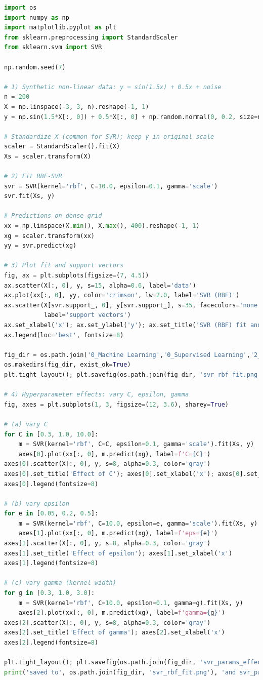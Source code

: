\documentclass{article}
\begin{document}
\begin{lstlisting}[language=Python,caption={gen_svr_figures.py}]
import os
import numpy as np
import matplotlib.pyplot as plt
from sklearn.preprocessing import StandardScaler
from sklearn.svm import SVR

np.random.seed(7)

# 1) Synthetic non-linear data: y = sin(1.5x) + 0.5x + noise
n = 200
X = np.linspace(-3, 3, n).reshape(-1, 1)
y = np.sin(1.5*X[:, 0]) + 0.5*X[:, 0] + np.random.normal(0, 0.2, size=n)

# Standardize X (common for SVR); keep y in original scale
scaler = StandardScaler().fit(X)
Xs = scaler.transform(X)

# 2) Fit RBF-SVR
svr = SVR(kernel='rbf', C=10.0, epsilon=0.1, gamma='scale')
svr.fit(Xs, y)

# Predictions on dense grid
xx = np.linspace(X.min(), X.max(), 400).reshape(-1, 1)
xg = scaler.transform(xx)
yy = svr.predict(xg)

# 3) Plot fit and support vectors
fig, ax = plt.subplots(figsize=(7, 4.5))
ax.scatter(X[:, 0], y, s=15, alpha=0.6, label='data')
ax.plot(xx[:, 0], yy, color='crimson', lw=2.0, label='SVR (RBF)')
ax.scatter(X[svr.support_, 0], y[svr.support_], s=35, facecolors='none', edgecolors='k',
           label='support vectors')
ax.set_xlabel('x'); ax.set_ylabel('y'); ax.set_title('SVR (RBF) fit and support vectors')
ax.legend(loc='best', fontsize=8)

fig_dir = os.path.join('0_Machine Learning','0_Supervised Learning','2_SVR','figures')
os.makedirs(fig_dir, exist_ok=True)
plt.tight_layout(); plt.savefig(os.path.join(fig_dir, 'svr_rbf_fit.png'), dpi=160)

# 4) Hyperparameter effects: vary C, epsilon, gamma
fig, axes = plt.subplots(1, 3, figsize=(12, 3.6), sharey=True)

# (a) vary C
for C in [0.3, 1.0, 10.0]:
    m = SVR(kernel='rbf', C=C, epsilon=0.1, gamma='scale').fit(Xs, y)
    axes[0].plot(xx[:, 0], m.predict(xg), label=f'C={C}')
axes[0].scatter(X[:, 0], y, s=8, alpha=0.3, color='gray')
axes[0].set_title('Effect of C'); axes[0].set_xlabel('x'); axes[0].set_ylabel('y')
axes[0].legend(fontsize=8)

# (b) vary epsilon
for e in [0.05, 0.2, 0.5]:
    m = SVR(kernel='rbf', C=10.0, epsilon=e, gamma='scale').fit(Xs, y)
    axes[1].plot(xx[:, 0], m.predict(xg), label=f'eps={e}')
axes[1].scatter(X[:, 0], y, s=8, alpha=0.3, color='gray')
axes[1].set_title('Effect of epsilon'); axes[1].set_xlabel('x')
axes[1].legend(fontsize=8)

# (c) vary gamma (kernel width)
for g in [0.3, 1.0, 3.0]:
    m = SVR(kernel='rbf', C=10.0, epsilon=0.1, gamma=g).fit(Xs, y)
    axes[2].plot(xx[:, 0], m.predict(xg), label=f'gamma={g}')
axes[2].scatter(X[:, 0], y, s=8, alpha=0.3, color='gray')
axes[2].set_title('Effect of gamma'); axes[2].set_xlabel('x')
axes[2].legend(fontsize=8)

plt.tight_layout(); plt.savefig(os.path.join(fig_dir, 'svr_params_effect.png'), dpi=160)
print('saved to', os.path.join(fig_dir, 'svr_rbf_fit.png'), 'and svr_params_effect.png')
\end{lstlisting}
\end{document}
